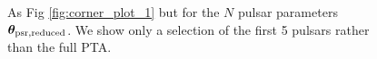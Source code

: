 \documentclass[fleqn,usenatbib,useAMS]{mnras}
\begin{document}
\begin{figure}%
	\centering
	\qquad
	\qquad
	
	\caption{As Fig \ref{fig:corner_plot_1} but for the $N$ pulsar parameters $\boldsymbol{\theta}_{\rm psr, reduced}$. We show only a selection of the first 5 pulsars rather than the full PTA.}
	\label{fig:example}%
\end{figure}




%
%
%
%
%
%
%
%
\end{document}
